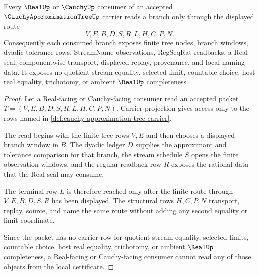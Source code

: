 \begin{theorem}\label{thm:cauchy-approximation-tree-branch-readback}
Every $\RealUp$ or $\CauchyUp$ consumer of an accepted $\CauchyApproximationTreeUp$ carrier reads a branch only through the displayed route
$$
V,E,B,D,S,R,L,H,C,P,N .
$$
Consequently each consumed branch exposes finite tree nodes, branch windows, dyadic tolerance rows, StreamName observations, RegSeqRat readbacks, a Real seal, componentwise transport, displayed replay, provenance, and local naming data. It exposes no quotient stream equality, selected limit, countable choice, host real equality, trichotomy, or ambient $\RealUp$ completeness.
\end{theorem}
\begin{proof}
Let a Real-facing or Cauchy-facing consumer read an accepted packet $T=(V,E,B,D,S,R,L,H,C,P,N)$. Carrier projection gives access only to the rows named in \autoref{def:cauchy-approximation-tree-carrier}.

The read begins with the finite tree rows $V,E$ and then chooses a displayed branch window in $B$. The dyadic ledger $D$ supplies the approximant and tolerance comparison for that branch, the stream schedule $S$ opens the finite observation windows, and the regular readback row $R$ exposes the rational data that the Real seal may consume.

The terminal row $L$ is therefore reached only after the finite route through $V,E,B,D,S,R$ has been displayed. The structural rows $H,C,P,N$ transport, replay, source, and name the same route without adding any second equality or limit coordinate.

Since the packet has no carrier row for quotient stream equality, selected limits, countable choice, host real equality, trichotomy, or ambient $\RealUp$ completeness, a Real-facing or Cauchy-facing consumer cannot read any of those objects from the local certificate.
\end{proof}



